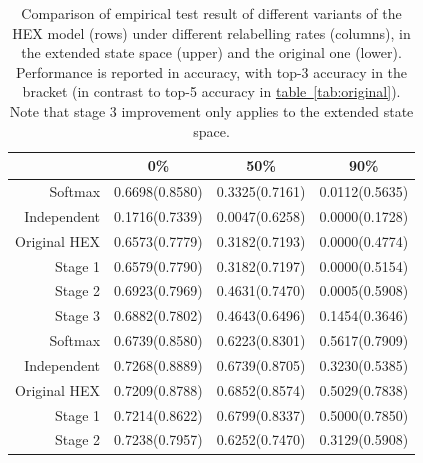 \documentclass[11pt,a4paper]{article}
\begin{document}
\begin{table}[htbp]
\centering
\begin{tabular}{r|c|c|c}
 & 0\% & 50\% & 90\%\\
\hline
Softmax      & 0.6698(0.8580) & 0.3325(0.7161) & 0.0112(0.5635)\\
Independent  & 0.1716(0.7339) & 0.0047(0.6258) & 0.0000(0.1728)\\
Original HEX & 0.6573(0.7779) & 0.3182(0.7193) & 0.0000(0.4774)\\
Stage 1      & 0.6579(0.7790) & 0.3182(0.7197) & 0.0000(0.5154)\\
Stage 2      & 0.6923(0.7969) & 0.4631(0.7470) & 0.0005(0.5908)\\
Stage 3      & 0.6882(0.7802) & 0.4643(0.6496) & 0.1454(0.3646)\\
\hline
Softmax      & 0.6739(0.8580) & 0.6223(0.8301) & 0.5617(0.7909)\\
Independent  & 0.7268(0.8889) & 0.6739(0.8705) & 0.3230(0.5385)\\
Original HEX & 0.7209(0.8788) & 0.6852(0.8574) & 0.5029(0.7838)\\
Stage 1      & 0.7214(0.8622) & 0.6799(0.8337) & 0.5000(0.7850)\\
Stage 2      & 0.7238(0.7957) & 0.6252(0.7470) & 0.3129(0.5908)
\end{tabular}
\caption{Comparison of empirical test result of different variants of the 	HEX model (rows) under different relabelling rates (columns), in the extended state space (upper) and the original one (lower). Performance is reported in accuracy, with top-3 accuracy in the bracket (in contrast to top-5 accuracy in \hyperref[tab:original]{table~\ref{tab:original}}). Note that stage 3 improvement only applies to the extended state space.}
\label{tab:cnnacc}
\end{table}
\end{document}
